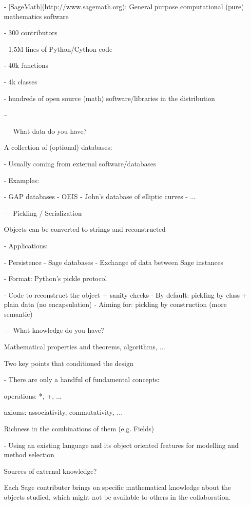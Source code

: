 \documentclass{deliverablereport}
\begin{document}
  - [SageMath](http://www.sagemath.org): General purpose computational (pure) mathematics software

- 300 contributors

- 1.5M lines of Python/Cython code

- 40k functions

- 4k classes

- hundreds of open source (math) software/libraries in the distribution

--

---
 What data do you have?

 A collection of (optional) databases:

- Usually coming from external software/databases

- Examples:

  - GAP databases
  - OEIS
  - John's database of elliptic curves
  - ...

---
 Pickling / Serialization

Objects can be converted to strings and reconstructed

- Applications:

  - Persistence
  - Sage databases
  - Exchange of data between Sage instances

- Format: Python's pickle protocol

  - Code to reconstruct the object + sanity checks
  - By default: pickling by class + plain data (no encapsulation)
  - Aiming for: pickling by construction (more semantic)



---
 What knowledge do you have?

Mathematical properties and theorems, algorithms, ...


 Two key points that conditioned the design

- There are only a handful of fundamental concepts:

  operations: *, +, ...

  axioms: associativity, commutativity, ...

  Richness in the combinations of them (e.g. Fields)

- Using an existing language and its object oriented features for
  modelling and method selection


 Sources of external knowledge?

Each Sage contributer brings on specific mathematical knowledge about
the objects studied, which might not be available to others in the
collaboration.
\end{document}
